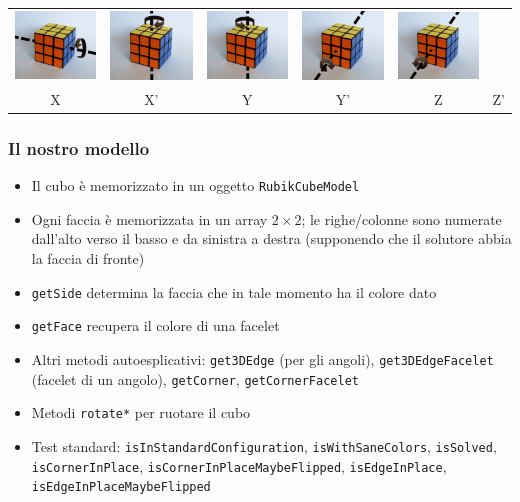 \documentclass{beamer}
\begin{document}
\begin{frame}
\begin{table}[h]
\begin{tabular}{cccccc}
\includegraphics[width=.12\textwidth]{../graphics/moves/X_inv.png} &
\includegraphics[width=.12\textwidth]{../graphics/moves/Y.png} &
\includegraphics[width=.12\textwidth]{../graphics/moves/Y_inv.png} &
\includegraphics[width=.12\textwidth]{../graphics/moves/Z.png} &
\includegraphics[width=.12\textwidth]{../graphics/moves/Z_inv.png} \\
X & X' & Y & Y' & Z & Z'
\end{tabular}
\end{table}
\end{frame}

\begin{frame}
\frametitle{Il nostro modello}
\begin{itemize}
\item Il cubo è memorizzato in un oggetto \texttt{RubikCubeModel}
\item Ogni faccia è memorizzata in un array $2\times 2$; le righe/colonne sono
numerate dall'alto verso il basso e da sinistra a destra (supponendo che il
solutore abbia la faccia di fronte)
\item \texttt{getSide} determina la faccia che in tale momento ha il colore dato
\item \texttt{getFace} recupera il colore di una facelet
\item Altri metodi autoesplicativi: \texttt{get3DEdge} (per gli angoli),
\texttt{get3DEdgeFacelet} (facelet di un angolo), \texttt{getCorner},
\texttt{getCornerFacelet}
\item Metodi \texttt{rotate*} per ruotare il cubo
\item Test standard: \texttt{isInStandardConfiguration},
\texttt{isWithSaneColors}, \texttt{isSolved}, \texttt{isCornerInPlace},
\texttt{isCornerInPlaceMaybeFlipped}, \texttt{isEdgeInPlace},
\texttt{isEdgeInPlaceMaybeFlipped}
\end{itemize}
\end{frame}
\end{document}
